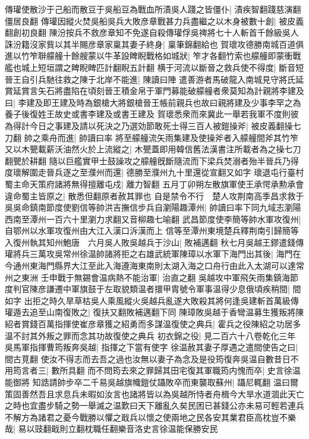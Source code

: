 傳瓘使散沙于己船而散豆于吳船豆為戰血所漬吳人踐之皆僵仆|{
	漬疾智翻踐慈演翻僵居良翻}
傳瓘因縱火焚吳船吳兵大敗彦章戰甚力兵盡繼之以木身被數十創|{
	被皮義翻創初良翻}
陳汾按兵不救彦章知不免遂自殺傳瓘俘吳禆將七十人斬首千餘級吳人誅汾籍沒家貲以其半賜彦章家稟其妻子終身|{
	稟筆錦翻給也}
賀瓌攻德勝南城百道俱進以竹笮聨艨艟十餘艘蒙以牛革設睥睨戰格如城狀|{
	笮才各翻竹索也艨艟即蒙衝戰艦也城上短垣謂之睥睨睥匹計翻睨五計翻}
横于河流以斷晉之救兵使不得度|{
	斷音短}
晉王自引兵馳往救之陳于北岸不能進|{
	陳讀曰陣}
遣善游者馬破龍入南城見守將氏延賞延賞言矢石將盡陷在頃刻晉王積金帛于軍門募能破艨艟者衆莫知為計親將李建及曰|{
	李建及即王建及時為銀槍大將銀槍晉王帳前親兵也故曰親將建及少事李罕之為養子後復姓王故史或書李建及或書王建及}
賀瓌悉衆而來冀此一舉若我軍不度則彼為得計今日之事建及請以死決之乃選効節敢死士得三百人被鎧操斧|{
	被皮義翻操七刀翻}
帥之乘舟而進|{
	帥讀曰率}
將至艨艟流矢雨集建及使操斧者入艨艟間斧其竹笮又以木甖載薪沃油然火於上流縱之|{
	木甖蓋即用韓信舊法漢書注所載者為之操七刀翻甖於耕翻}
隨以巨艦實甲士鼓譟攻之艨艟旣斷隨流而下梁兵焚溺者殆半晉兵乃得度瓌解圍走晉兵逐之至濮州而還|{
	德勝至濮州九十里還從宣翻又如字}
瓌退屯行臺村　蜀主命天策府諸將無得擅離屯戍|{
	離力智翻}
五月丁卯朔左散旗軍使王承愕承勲承會違命蜀主皆原之|{
	散悉但翻原者赦其罪也}
自是禁令不行　楚人攻荆南高季昌求救于吳吳命鎮南節度使劉信等帥洪吉撫信步兵自瀏陽趣潭州|{
	帥讀曰率下同九域志瀏陽西南至潭州一百六十里瀏力求翻又音柳趣七喻翻}
武昌節度使李簡等帥水軍攻復州|{
	自鄂州以水軍攻復州由大江入漢口泝漢而上}
信等至潭州東境楚兵釋荆南引歸簡等入復州執其知州鮑唐　六月吳人敗吳越兵于沙山|{
	敗補邁翻}
秋七月吳越王鏐遣錢傳瓘將兵三萬攻吳常州徐温帥諸將拒之右雄武統軍陳璋以水軍下海門出其後|{
	海門在今通州東海門縣界大江至此入海遵海東南則太湖入海之口舟行由此入太湖可以達常州之東洲}
壬申戰于無錫會温病熱不能治軍|{
	治直之翻}
吳越攻中軍飛矢雨集鎮海節度判官陳彦謙遷中軍旗鼓于左取貌類温者擐甲胄號令軍事温得少息俄頃疾稍間|{
	間如字}
出拒之時久旱草枯吳人乘風縱火吳越兵亂遂大敗殺其將何逢吳建斬首萬級傳瓘遁去追至山南復敗之|{
	復扶又翻敗補邁翻下同}
陳璋敗吳越于香彎温募生獲叛將陳紹者賞錢百萬指揮使崔彦章獲之紹勇而多謀温復使之典兵|{
	霍兵之役陳紹之功居多温不討其外叛之罪而念其功故復使之典兵}
初衣錦之役|{
	見二百六十八卷乾化三年}
吳馬軍指揮曹筠叛奔吳越|{
	指揮之下當有使字}
徐温赦其妻子厚遇之遣間使告之曰|{
	間古莧翻}
使汝不得志而去吾之過也汝無以妻子為念及是役筠復奔吳温自數昔日不用筠言者三|{
	數所具翻}
而不問筠去來之罪歸其田宅復其軍職筠内愧而卒|{
	史言徐温能御將}
知誥請帥步卒二千易吳越旗幟鎧仗躡敗卒而東襲取蘇州|{
	躡尼輒翻}
温曰爾策固善然吾且求息兵未暇如汝言也諸將皆以為吳越所恃者舟楫今大旱水道涸此天亡之時也宜盡步騎之勢一舉滅之温歎曰天下離亂久矣民困已甚錢公亦未易可輕若連兵不解方為諸君之憂今戰勝以懼之戢兵以懷之使兩地之民各安其業君臣高枕豈不樂哉|{
	易以豉翻戢則立翻枕職任翻樂音洛史言徐温能保勝安民}
